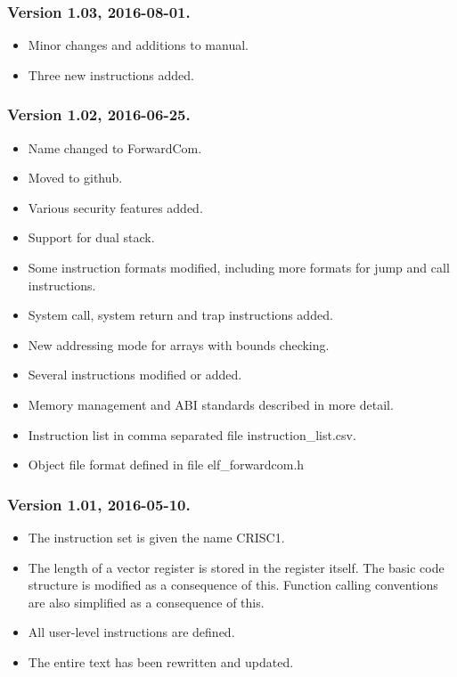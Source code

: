 \documentclass[forwardcom.tex]{subfiles}
\begin{document}
\subsubsection{Version 1.03, 2016-08-01.}
\begin{itemize}
\item Minor changes and additions to manual.
\item Three new instructions added.
\end{itemize}

\subsubsection{Version 1.02, 2016-06-25.}
\begin{itemize}
\item Name changed to ForwardCom.
\item Moved to github.
\item Various security features added.
\item Support for dual stack.
\item Some instruction formats modified, including more formats for jump and call instructions.
\item System call, system return and trap instructions added.
\item New addressing mode for arrays with bounds checking.
\item Several instructions modified or added.
\item Memory management and ABI standards described in more detail.
\item Instruction list in comma separated file instruction\_list.csv.
\item Object file format defined in file elf\_forwardcom.h
\end{itemize}

\subsubsection{Version 1.01, 2016-05-10.}
\begin{itemize}
\item The instruction set is given the name CRISC1.
\item The length of a vector register is stored in the register itself. The basic code structure is modified as a consequence of this. Function calling conventions are also simplified as a consequence of this.
\item All user-level instructions are defined.
\item The entire text has been rewritten and updated.
\end{itemize}
\end{document}
